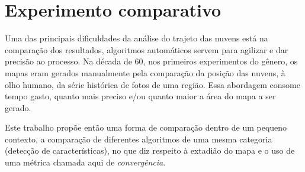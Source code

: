 \chapter{Experimento comparativo}

Uma das principais dificuldades da análise do trajeto das nuvens está na comparação dos resultados, algoritmos automáticos servem para agilizar e dar precisão ao processo. Na década de 60, nos primeiros experimentos do gênero, os mapas eram gerados manualmente pela comparação da posição das nuvens, à olho humano, da série histórica de fotos de uma região. Essa abordagem consome tempo gasto, quanto mais preciso e/ou quanto maior a área do mapa a ser gerado.

Este trabalho propõe então uma forma de comparação dentro de um pequeno contexto, a comparação de diferentes algoritmos de uma mesma categoria (detecção de características), no que diz respeito à extadião do mapa e o uso de uma métrica chamada aqui de \textit{convergência}.
